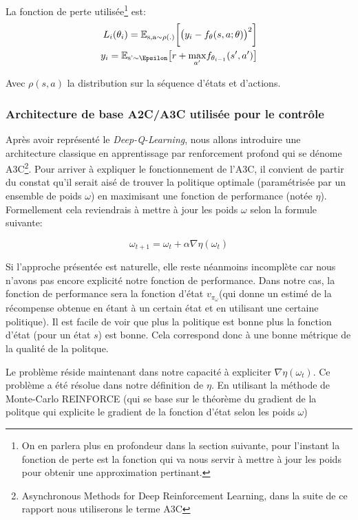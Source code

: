 La fonction de perte utilisée\footnote{On en parlera plus en profondeur dans la section suivante, pour l'instant la fonction de perte est la fonction qui va nous servir à mettre à jour les poids pour obtenir une approximation pertinant.} est: 
\begin{align}
L_i(\theta_i) = \mathbb{E_{\text{s}, \text{a} \sim \rho(.)}}\bigg[ \big( y_i - f_\theta(s, a; \theta)\big)^2 \bigg]\\
y_i = \mathbb{E}_{\text{s'} \sim \Epsilon}\big[r + \underset{a'}{\max}f_{\theta_{i-1}}(s', a') \big] 
\end{align}

Avec $\rho(s, a)$ la distribution sur la séquence d'états et d'actions.

\subsubsection{Architecture de base A2C/A3C utilisée pour le contrôle}
Après avoir représenté le \emph{Deep-Q-Learning}, nous allons introduire une architecture classique en apprentissage par renforcement profond qui se dénome \gls{A3C}\cite{DBLP:journals/corr/MnihBMGLHSK16}\footnote{Asynchronous Methods for Deep Reinforcement Learning, dans la suite de ce rapport nous utiliserons le terme \gls{A3C}}. 
Pour arriver à expliquer le fonctionnement de l'\gls{A3C}, il convient de partir du constat qu'il serait aisé de trouver la politique optimale (paramétrisée par un ensemble de poids $\omega$) en maximisant une fonction de performance (notée $\eta$). Formellement cela reviendrais à mettre à jour les poids $\omega$ selon la formule suivante:

\begin{equation}
    \omega_{t+1} = \omega_t + \alpha \nabla \eta(\omega_t)
\end{equation}

Si l'approche présentée  est naturelle, elle reste néanmoins incomplète car nous n'avons pas encore explicité notre fonction de performance. Dans notre cas, la fonction de performance sera la fonction d'état $v_{\pi_\omega}$(qui donne un estimé de la récompense obtenue en étant à un certain état et en utilisant une certaine politique). Il est facile de voir que plus la politique est bonne plus la fonction d'état (pour un état $s$) est bonne. Cela correspond donc à une bonne métrique de la qualité de la politque.


Le problème réside maintenant dans notre capacité à expliciter $\nabla\eta(\omega_t)$. Ce problème a été résolue dans notre définition de $\eta$. En utilisant la méthode de Monte-Carlo REINFORCE \cite{Williams1992} (qui se base sur le théorème du gradient de la politque \cite{policygradient} qui explicite le gradient de la fonction d'état selon les poids $\omega$) 

